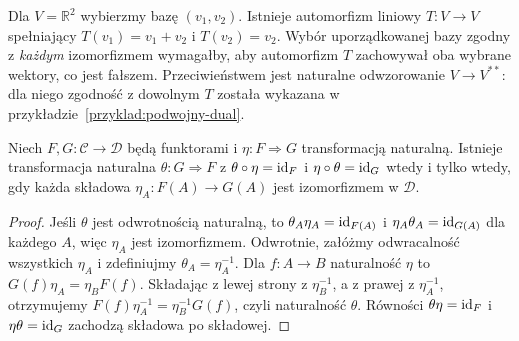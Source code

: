 \begin{przyklad}
Dla $V=\mathbb R^2$ wybierzmy bazę $(v_1,v_2)$. Istnieje automorfizm liniowy $T:V\to V$ spełniający $T(v_1)=v_1+v_2$ i $T(v_2)=v_2$. Wybór uporządkowanej bazy zgodny z \emph{każdym} izomorfizmem wymagałby, aby automorfizm $T$ zachowywał oba wybrane wektory, co jest fałszem. Przeciwieństwem jest naturalne odwzorowanie $V\to V^{**}$: dla niego zgodność z dowolnym $T$ została wykazana w przykładzie~\ref{przyklad:podwojny-dual}.
\end{przyklad}



\begin{stwierdzenie}\label{tw:nat-iso-components}
Niech $F,G:\mathcal C\to\mathcal D$ będą funktorami i $\eta:F\Rightarrow G$ transformacją naturalną. Istnieje transformacja naturalna $\theta:G\Rightarrow F$ z $\theta\circ\eta=\mathrm{id}_F$ i $\eta\circ\theta=\mathrm{id}_G$ wtedy i tylko wtedy, gdy każda składowa $\eta_A:F(A)\to G(A)$ jest izomorfizmem w $\mathcal D$.
\end{stwierdzenie}
\begin{proof}
Jeśli $\theta$ jest odwrotnością naturalną, to $\theta_A\eta_A=\mathrm{id}_{F(A)}$ i $\eta_A\theta_A=\mathrm{id}_{G(A)}$ dla każdego $A$, więc $\eta_A$ jest izomorfizmem. Odwrotnie, załóżmy odwracalność wszystkich $\eta_A$ i zdefiniujmy $\theta_A=\eta_A^{-1}$. Dla $f:A\to B$ naturalność $\eta$ to $G(f)\eta_A=\eta_BF(f)$. Składając z lewej strony z $\eta_B^{-1}$, a z prawej z $\eta_A^{-1}$, otrzymujemy $F(f)\eta_A^{-1}=\eta_B^{-1}G(f)$, czyli naturalność $\theta$. Równości $\theta\eta=\mathrm{id}_F$ i $\eta\theta=\mathrm{id}_G$ zachodzą składowa po składowej.
\end{proof}


